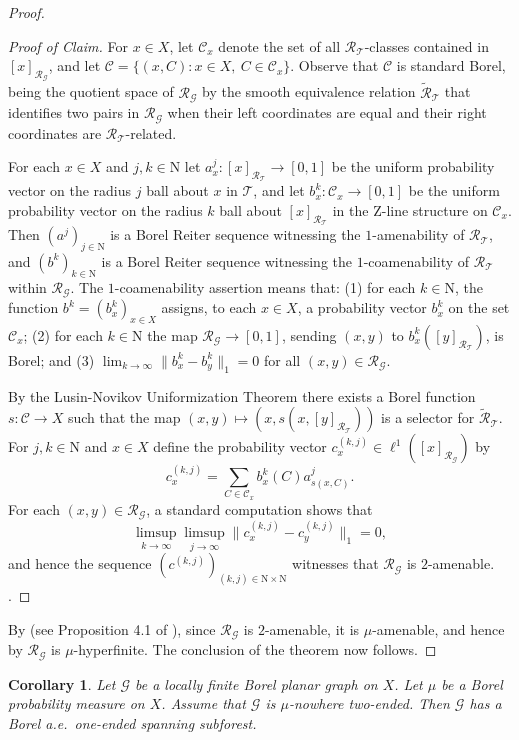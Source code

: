 \documentclass[11pt]{amsart}
\theoremstyle{definition}
\theoremstyle{plain}
\newtheorem{corollary}[definition]{Corollary}
\newcommand{\<}{\langle}
\renewcommand{\>}{\rangle}
\newcommand{\N}{\bm{\mathrm{N}}}
\newcommand{\Z}{\bm{\mathrm{Z}}}
\newcommand{\Ggraph}{\mathcal{G}}
\newcommand{\Tgraph}{\mathcal{T}}
\newcommand\RR{\mathscr{R}}
\begin{document}
\begin{proof}
\begin{proof}[Proof of Claim]
For $x\in X$, let $\mathcal{C}_x$ denote the set of all $\RR_{\Tgraph}$-classes contained in $[x]_{\RR_{\Ggraph}}$, and let $\mathcal{C}= \{ (x,C): x\in X, \ C\in \mathcal{C}_x \}$.
Observe that $\mathcal{C}$ is standard Borel, being the quotient space of $\RR_{\Ggraph}$ by the smooth equivalence relation $\tilde{\RR}_{\Tgraph}$ that identifies two pairs in $\RR_{\Ggraph}$ when their left coordinates are equal and their right coordinates are $\RR_{\Tgraph}$-related. 

For each $x\in X$ and $j,k\in \N$ let $a^j_x:[x]_{\RR_{\Tgraph}}\to [0,1]$ be the uniform probability vector on the radius $j$ ball about $x$ in $\Tgraph$, and let $b^k_x :\mathcal{C}_x\to [0,1]$ be the uniform probability vector on the radius $k$ ball about $[x]_{\RR_{\Tgraph}}$ in the $\Z$-line structure on $\mathcal{C}_x$.
Then $(a^j)_{j\in \N}$ is a Borel Reiter sequence witnessing the $1$-amenability of $\RR_{\Tgraph}$, and $(b^k)_{k\in \N}$ is a Borel Reiter sequence witnessing the $1$-coamenability of $\RR_{\Tgraph}$ within $\RR_{\Ggraph}$.
The $1$-coamenability assertion means that: (1) for each $k\in \N$, the function $b^k=(b^k_x)_{x\in X}$ assigns, to each $x\in X$, a probability vector $b^k_x$ on the set $\mathcal{C}_x$; (2) for each $k\in\N$ the map $\RR_{\Ggraph}\to [0,1]$, sending $(x,y)$ to $b^k_x([y]_{\RR_{\Tgraph}})$, is Borel; and (3) $\lim_{k\to\infty} \| b^k_x-b^k_y\|_1  = 0$ for all $(x,y)\in\RR_{\Ggraph}$.

By the Lusin-Novikov Uniformization Theorem there exists a Borel function $s:\mathcal{C}\to X$ such that the map $(x,y)\mapsto (x,s(x,[y]_{\RR_\Tgraph}))$ is a selector for $\tilde{\RR}_{\Tgraph}$.   
For $j,k\in\N$ and $x\in X$ define the probability vector $c^{(k,j)}_x \in \ell ^1([x]_{\RR_{\Ggraph}})$ by
\[
c^{(k,j)}_x = \sum _{C\in\mathcal{C}_x}b^k_x(C)a^j_{s(x,C)}.
\]
For each $(x,y)\in\RR_{\Ggraph}$, a standard computation shows that
\[
\limsup_{k\to\infty}\limsup_{j\to\infty}\| c^{(k,j)}_x - c^{(k,j)}_y\|_1 = 0,
\]
and hence the sequence $(c^{(k,j)})_{(k,j)\in\N\times\N}$ witnesses that $\RR_{\Ggraph}$ is $2$-amenable.
\qedhere[Claim].
\end{proof}
By \cite{JKL02} (see Proposition 4.1 of \cite{EOSS:hyperfiniteness}), since $\RR_\Ggraph$ is $2$-amenable, it is $\mu$-amenable, and hence by \cite{CFW81} $\RR_{\Ggraph}$ is $\mu$-hyperfinite. 
The conclusion of the theorem now follows.
\end{proof}

\begin{corollary}\label{cor:planarforest}
Let ${\Ggraph}$ be a locally finite Borel planar graph on $X$. Let $\mu$ be a Borel probability measure on $X$. Assume that
${\Ggraph}$ is $\mu$-nowhere two-ended. Then $\Ggraph$ has a Borel a.e.\ one-ended spanning subforest.
\end{corollary}
\end{document}
